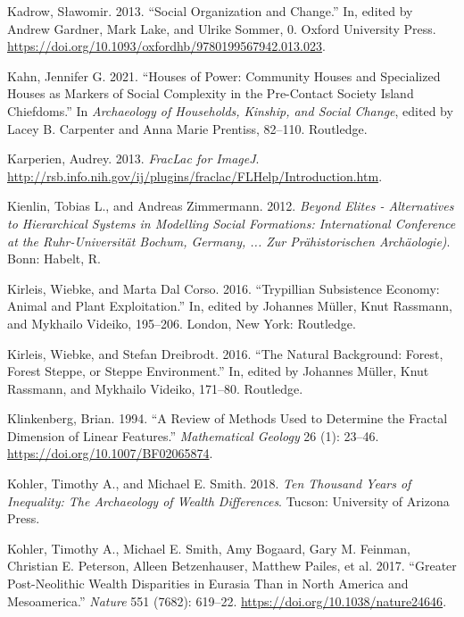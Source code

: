 \documentclass[
  12pt,
  a4paper, twoside]{book}
\newlength{\cslhangindent}
\newlength{\cslentryspacingunit} %
\newenvironment{CSLReferences}[2] %
 {%
  \setlength{\parindent}{0pt}
  \ifodd #1
  \let\oldpar\par
  \def\par{\hangindent=\cslhangindent\oldpar}
  \fi
  \setlength{\parskip}{#2\cslentryspacingunit}
 }%
 {}
\begin{document}
\begin{CSLReferences}{1}{0}
\leavevmode{}%
Kadrow, Sławomir. 2013. {``Social Organization and Change.''} In, edited by Andrew Gardner, Mark Lake, and Ulrike Sommer, 0. Oxford University Press. \url{https://doi.org/10.1093/oxfordhb/9780199567942.013.023}.

\leavevmode{}%
Kahn, Jennifer G. 2021. {``Houses of Power: {Community} Houses and Specialized Houses as Markers of Social Complexity in the Pre-Contact {Society Island} Chiefdoms.''} In \emph{Archaeology of {Households}, {Kinship}, and {Social Change}}, edited by Lacey B. Carpenter and Anna Marie Prentiss, 82--110. {Routledge}.

\leavevmode{}%
Karperien, Audrey. 2013. \emph{FracLac for ImageJ}. \url{http://rsb.info.nih.gov/ij/plugins/fraclac/FLHelp/Introduction.htm}.

\leavevmode{}%
Kienlin, Tobias L., and Andreas Zimmermann. 2012. \emph{Beyond Elites - Alternatives to Hierarchical Systems in Modelling Social Formations: International Conference at the Ruhr-Universität Bochum, Germany, ... Zur Prähistorischen Archäologie)}. Bonn: Habelt, R.

\leavevmode{}%
Kirleis, Wiebke, and Marta Dal Corso. 2016. {``Trypillian Subsistence Economy: Animal and Plant Exploitation.''} In, edited by Johannes Müller, Knut Rassmann, and Mykhailo Videiko, 195--206. London, New York: Routledge.

\leavevmode{}%
Kirleis, Wiebke, and Stefan Dreibrodt. 2016. {``The Natural Background: Forest, Forest Steppe, or Steppe Environment.''} In, edited by Johannes Müller, Knut Rassmann, and Mykhailo Videiko, 171--80. Routledge.

\leavevmode{}%
Klinkenberg, Brian. 1994. {``A Review of Methods Used to Determine the Fractal Dimension of Linear Features.''} \emph{Mathematical Geology} 26 (1): 23--46. \url{https://doi.org/10.1007/BF02065874}.

\leavevmode{}%
Kohler, Timothy A., and Michael E. Smith. 2018. \emph{Ten Thousand Years of Inequality: The Archaeology of Wealth Differences}. Tucson: University of Arizona Press.

\leavevmode{}%
Kohler, Timothy A., Michael E. Smith, Amy Bogaard, Gary M. Feinman, Christian E. Peterson, Alleen Betzenhauser, Matthew Pailes, et al. 2017. {``Greater Post-Neolithic Wealth Disparities in Eurasia Than in North America and Mesoamerica.''} \emph{Nature} 551 (7682): 619--22. \url{https://doi.org/10.1038/nature24646}.


\end{CSLReferences}
\end{document}
